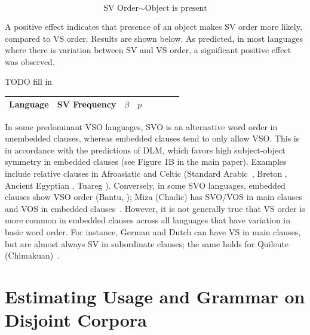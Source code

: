 \documentclass[11pt,a4paper]{article}
\begin{document}
\begin{equation}
\text{SV Order} \sim \text{Object is present}
\end{equation}

A positive effect indicates that presence of an object makes SV order more likely, compared to VS order.
Results are shown below.
As predicted, in most languages where there is variation between SV and VS order, a significant positive effect was observed.

TODO fill in
\begin{longtable}{l|lllllll}
Language & SV Frequency & $\beta$ & $p$ \\ \hline

\end{longtable}




In some predominant VSO languages, SVO is an alternative word order in unembedded clauses, whereas embedded clauses tend to only allow VSO.
This is in accordance with the predictions of DLM, which favors high subject-object symmetry in embedded clauses (see Figure 1B in the main paper).
Examples include relative clauses in Afroasiatic and Celtic (Standard Arabic~\citep{alqurashi:2012}, Breton \citep[][p. 80]{timm1988relative}, Ancient Egyptian \citep{gardiner1957egyptian}, Tuareg \citep[Chapter 12.1.2]{heath2005a}).
Conversely, in some SVO languages, embedded clauses show VSO order (Bantu, \citet{demuth1999verb}); Miza (Chadic) has SVO/VOS in main clauses and VOS in embedded clauses~\citep{wals-81}.
However, it is not generally true that VS order is more common in embedded clauses across all languages that have variation in basic word order.
For instance, German and Dutch can have VS in main clauses, but are almost always SV in subordinate clauses; the same holds for Quileute (Chimakuan)~\citep{wals-81}.





\section{Estimating Usage and Grammar on Disjoint Corpora}




\end{document}
